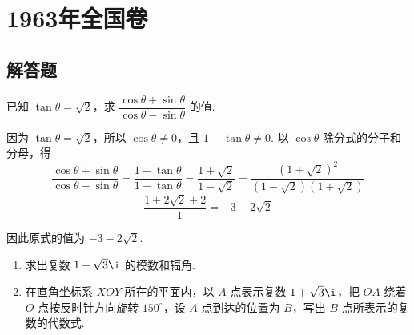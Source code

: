 \documentclass[UTF8,a4paper,oneside,11pt]{ctexbook}
\begin{document}
\mainmatter


\chapter{1963年全国卷}

\section{解答题}

\begin{problem}
已知 \(\tan\theta=\sqrt2\)，求 \(\dfrac{\cos\theta+\sin\theta}{\cos\theta-\sin\theta}\) 的值.
\end{problem}

\begin{solution}
因为 \(\tan\theta=\sqrt2\)，所以 \(\cos\theta\neq0\)，且 \(1-\tan\theta\neq0\). 以 \(\cos\theta\) 除分式的分子和分母，得
\[
\frac{\cos\theta+\sin\theta}{\cos\theta-\sin\theta}
=\frac{1+\tan\theta}{1-\tan\theta}
=\frac{1+\sqrt2}{1-\sqrt2}
=\frac{\left( 1+\sqrt2 \right)^2}{\left( 1-\sqrt2 \right)\left( 1+\sqrt2 \right)}
\]
\[
\frac{1+2\sqrt2+2}{-1}=-3-2\sqrt2
\]

因此原式的值为 \(-3-2\sqrt2\).
\end{solution}

\begin{problem}
\begin{enumerate}
\item 求出复数 \(1+\sqrt3\i\) 的模数和辐角.
\item 在直角坐标系 \(XOY\) 所在的平面内，以 \(A\) 点表示复数 \(1+\sqrt3\i\)，把 \(OA\) 绕着 \(O\) 点按反时针方向旋转 \(150^\circ\)，设 \(A\) 点到达的位置为 \(B\)，写出 \(B\) 点所表示的复数的代数式.
\end{enumerate}
\end{problem}
\end{document}
